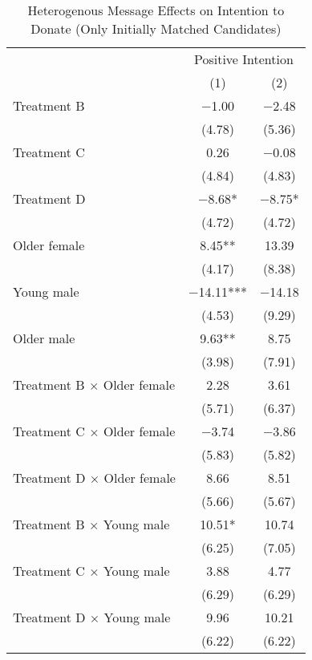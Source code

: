 \documentclass[12pt, a4paper]{article}
\begin{document}
\begin{table}[H]

\caption{\label{tab:lm-positive-interaction-init-reg}Heterogenous Message Effects on Intention to Donate (Only Initially Matched Candidates)}
\centering
\fontsize{8}{10}\selectfont
\begin{threeparttable}
\begin{tabular}[t]{lcc}
\toprule
\multicolumn{1}{c}{ } & \multicolumn{2}{c}{Positive Intention} \\
\cmidrule(l{3pt}r{3pt}){2-3}
  & (1) & (2)\\
\midrule
Treatment B & \num{-1.00} & \num{-2.48}\\
 & (\num{4.78}) & (\num{5.36})\\
Treatment C & \num{0.26} & \num{-0.08}\\
 & (\num{4.84}) & (\num{4.83})\\
Treatment D & \num{-8.68}* & \num{-8.75}*\\
 & (\num{4.72}) & (\num{4.72})\\
Older female & \num{8.45}** & \num{13.39}\\
 & (\num{4.17}) & (\num{8.38})\\
Young male & \num{-14.11}*** & \num{-14.18}\\
 & (\num{4.53}) & (\num{9.29})\\
Older male & \num{9.63}** & \num{8.75}\\
 & (\num{3.98}) & (\num{7.91})\\
Treatment B $\times$ Older female & \num{2.28} & \num{3.61}\\
 & (\num{5.71}) & (\num{6.37})\\
Treatment C $\times$ Older female & \num{-3.74} & \num{-3.86}\\
 & (\num{5.83}) & (\num{5.82})\\
Treatment D $\times$ Older female & \num{8.66} & \num{8.51}\\
 & (\num{5.66}) & (\num{5.67})\\
Treatment B $\times$ Young male & \num{10.51}* & \num{10.74}\\
 & (\num{6.25}) & (\num{7.05})\\
Treatment C $\times$ Young male & \num{3.88} & \num{4.77}\\
 & (\num{6.29}) & (\num{6.29})\\
Treatment D $\times$ Young male & \num{9.96} & \num{10.21}\\
 & (\num{6.22}) & (\num{6.22})\\

\end{tabular}
\end{threeparttable}
\end{table}
\end{document}
